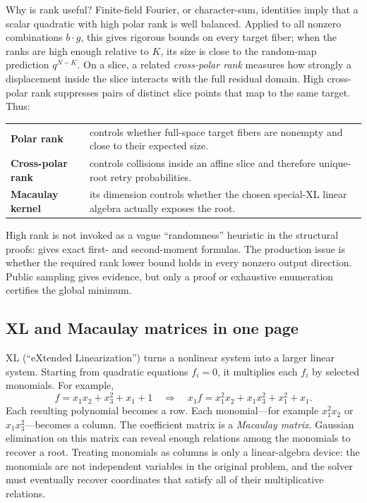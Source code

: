 \documentclass[11pt]{article}
\begin{document}
Why is rank useful?  Finite-field Fourier, or character-sum, identities imply
that a scalar quadratic with high polar rank is well balanced.  Applied to all nonzero combinations
$b\cdot g$, this gives rigorous bounds on every target fiber; when the ranks
are high enough relative to $K$, its size is close to the random-map prediction
$q^{N-K}$.  On a slice, a related
\emph{cross-polar rank} measures how strongly a displacement inside the slice
interacts with the full residual domain.  High cross-polar rank suppresses
pairs of distinct slice points that map to the same target.  Thus:
\begin{center}
\begin{tabularx}{0.91\textwidth}{@{}>{\bfseries}p{}X@{}}
Polar rank & controls whether full-space target fibers are nonempty and close
to their expected size.\\
Cross-polar rank & controls collisions inside an affine slice and therefore
unique-root retry probabilities.\\
Macaulay kernel & its dimension controls whether the chosen special-XL linear
algebra actually exposes the root.
\end{tabularx}
\end{center}
High rank is not invoked as a vague ``randomness'' heuristic in the structural
proofs:  gives exact first- and second-moment formulas.  The
production issue is whether the required rank lower bound holds in every
nonzero output direction.  Public sampling gives evidence, but only a proof or
exhaustive enumeration certifies the global minimum.

\subsection{XL and Macaulay matrices in one page}\label{sec:xl-primer}

XL (``eXtended Linearization'') turns a nonlinear system into a larger linear
system.  Starting from quadratic equations $f_i=0$, it multiplies each $f_i$
by selected monomials.  For example,
\[
  f=x_1x_2+x_3^2+x_1+1
  \quad\Longrightarrow\quad
  x_1f=x_1^2x_2+x_1x_3^2+x_1^2+x_1.
\]
Each resulting polynomial becomes a row.  Each monomial---for example
$x_1^2x_2$ or $x_1x_3^2$---becomes a column.  The coefficient matrix is a
\emph{Macaulay matrix}.  Gaussian elimination on this matrix can reveal enough
relations among the monomials to recover a root.  Treating monomials as columns
is only a linear-algebra device: the monomials are not independent variables in
the original problem, and the solver must eventually recover coordinates that
satisfy all of their multiplicative relations.
\end{document}
